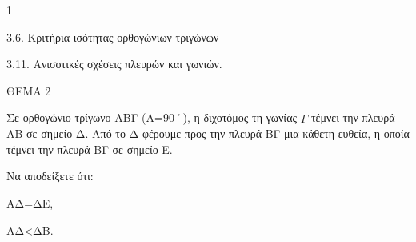 \begin{ylh}{1}
    \item 3.6. Κριτήρια ισότητας ορθογώνιων τριγώνων
    \item 3.11. Ανισοτικές σχέσεις πλευρών και γωνιών.
\end{ylh}

ΘΕΜΑ 2

Σε ορθογώνιο τρίγωνο ΑΒΓ (Α=90˚), η διχοτόμος τη γωνίας $\widehat{\Gamma}$ τέμνει την πλευρά ΑΒ σε σημείο Δ. Από το Δ φέρουμε προς την πλευρά ΒΓ μια κάθετη ευθεία, η οποία τέμνει την πλευρά ΒΓ σε σημείο Ε.

\begin{center}
\end{center}

Να αποδείξετε ότι:

\begin{alist}
\item ΑΔ=ΔΕ, 

\item ΑΔ\textless ΔΒ. 
\end{alist}
